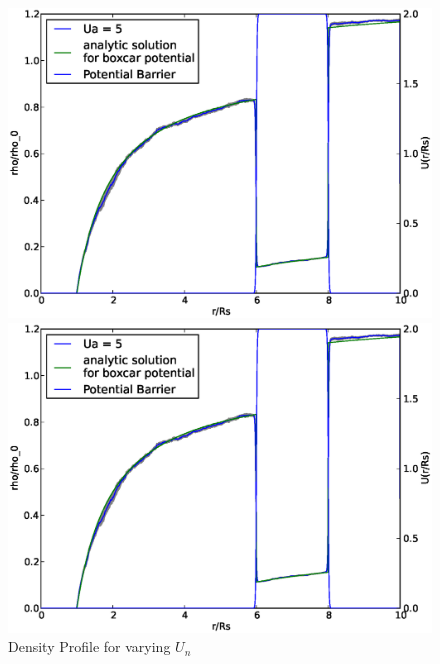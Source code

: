 \begin{figure}[H]
\begin{minipage}{.5 \textwidth}
    \includegraphics[width=.95 \textwidth, keepaspectratio]{plots/cp/un/Ua5.eps}
\end{minipage}\begin{minipage}{.5 \textwidth}
    \includegraphics[width=.95 \textwidth, keepaspectratio]{plots/cp/un/Ua5.eps}
\end{minipage}
 
    \caption{Density Profile for varying $U_n$}
    \label{fig:RhoUnCp}
\end{figure}

